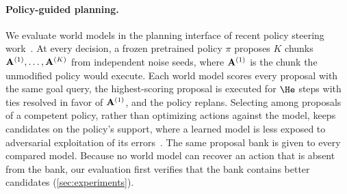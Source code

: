 \paragraph{Policy-guided planning.}
We evaluate world models in the planning interface of recent policy steering work~\cite{qi2025gpc,cui2026dreamsteer}.
At every decision, a frozen pretrained policy $\pi$ proposes $K$ chunks $\mathbf{A}^{(1)},\dots,\mathbf{A}^{(K)}$ from independent noise seeds, where $\mathbf{A}^{(1)}$ is the chunk the unmodified policy would execute.
Each world model scores every proposal with the same goal query, the highest-scoring proposal is executed for $\He$ steps with ties resolved in favor of $\mathbf{A}^{(1)}$, and the policy replans.
Selecting among proposals of a competent policy, rather than optimizing actions against the model, keeps candidates on the policy's support, where a learned model is less exposed to adversarial exploitation of its errors~\cite{janner2019mbpo,gao2023overoptimization}.
The same proposal bank is given to every compared model.
Because no world model can recover an action that is absent from the bank, our evaluation first verifies that the bank contains better candidates (\cref{sec:experiments}).

\begin{table}[t]
\centering
\small
\setlength{\tabcolsep}{3pt}
\caption{\textbf{Design properties} (not results) of world models for evaluating a candidate chunk. $P$ is the number of patch tokens per frame (hundreds), $M\in\{8,16,32\}$ the number of code tokens. \method's $M$ autoregressive steps are short but not automatically cheaper than $\He$ frame steps, so latency is measured, not assumed.}
\label{tab:designs}
\end{table}
